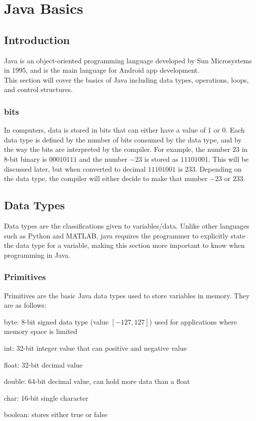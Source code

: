 \documentclass{article}
\begin{document}
\section{Java Basics}
\subsection{Introduction}
Java is an object-oriented programming language developed by Sun Microsystems in 1995, and is the main language for Android app development. \\
This section will cover the basics of Java including data types, operations, loops, and control structures.
\subsubsection{bits}
In computers, data is stored in bits that can either have a value of 1 or 0. Each data type is defined by the number of bits consumed by the data type, and by the way the bits are interpreted by the compiler. For example, the number $23$ in 8-bit binary is $00010111$ and the number $-23$ is stored as $11101001$. This will be discussed later, but when converted to decimal $11101001$ is $233$. Depending on the data type, the compiler will either decide to make that number $-23$ or $233$.
\subsection{Data Types}
Data types are the classifications given to variables/data. Unlike other languages such as Python and MATLAB, java requires the programmer to explicitly state the data type for a variable, making this section more important to know when programming in Java.
\subsubsection{Primitives}
Primitives are the basic Java data types used to store variables in memory. They are as follows:
\begin{steps}
	\item byte: 8-bit signed data type (value $[-127,127]$) used for applications where memory space is limited 
	\item int: 32-bit integer value that can positive and negative value
	\item float: 32-bit decimal value
	\item double: 64-bit decimal value, can hold more data than a float
	\item char: 16-bit single character
	\item boolean: stores either true or false
\end{steps}
\end{document}
